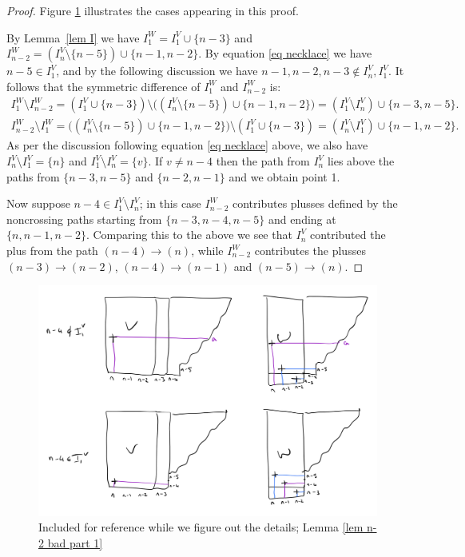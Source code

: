 \documentclass[11pt]{article}
\theoremstyle{remark}
\theoremstyle{definition}
\begin{document}
  \begin{proof}
    
Figure \ref{fig new le diagrams} illustrates the cases appearing in this proof.

By Lemma~\ref{lem I} we have $I_1^W = I_1^V\cup \{n-3\}$ and $I_{n-2}^W = (I_n^V \setminus \{n-5\}) \cup \{n-1,n-2\}$. By equation \eqref{eq necklace} we have $n-5 \in I_1^V$, and by the following discussion we have $n-1,n-2,n-3 \not\in I_n^V,I_1^V$. It follows that the symmetric difference of $I_1^W$ and $I_{n-2}^W$ is:
    \begin{gather*}
    I_1^W \setminus I_{n-2}^W = (I_1^V\cup\{n-3\}) \setminus \big((I_n^V\setminus \{n-5\})\cup \{n-1, n-2\}\big) = (I_1^V\setminus I_n^V) \cup \{n-3, n-5\}. \\
    I_{n-2}^W \setminus I_1^W = \big((I_n^V\setminus \{n-5\})\cup \{n-1, n-2\}\big) \setminus(I_1^V\cup\{n-3\}) = (I_n^V\setminus I_1^V) \cup \{n-1, n-2\}.
\end{gather*}
As per the discussion following equation \eqref{eq necklace} above, we also have $I_n^V\setminus I_1^V = \{n\}$ and $I_1^V\setminus I_n^V = \{v\}$. If $v \neq n-4$ then the path from $I_n^V$ lies above the paths from $\{n-3, n-5\}$ and $\{n-2, n-1\}$ and we obtain point 1.
    
Now suppose $n-4\in I_1^V\setminus I_{n}^V$; in this case $I_{n-2}^W$ contributes plusses defined by the noncrossing paths starting from $\{n-3, n-4, n-5\}$ and ending at $\{n, n-1, n-2\}$.  Comparing this to the above we see that $I_n^V$ contributed the plus from the path $(n-4)\rightarrow (n)$, while $I_{n-2}^W$ contributes the plusses $(n-3)\rightarrow (n-2)$, $(n-4)\rightarrow (n-1)$ and $(n-5)\rightarrow (n)$.
  \end{proof}
  
  \begin{figure}
\includegraphics[width = 12cm]{new_le_diagrams.jpg}
\caption{Included for reference while we figure out the details; Lemma \ref{lem n-2 bad part 1}}\label{fig new le diagrams}
  \end{figure}
\end{document}
